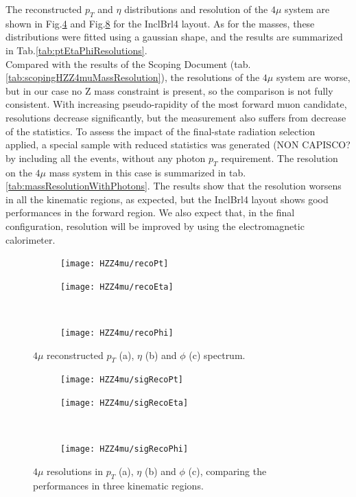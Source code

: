 \documentclass[a4paper,twoside,12pt]{book}
\begin{document}
The reconstructed $p_T$ and $\eta$ distributions and resolution of the $4\mu$ system 
are shown in Fig.\ref{fig:HZZ4mu:recoPtEtaPhi} and Fig.\ref{fig:HZZ4mu:sigRecoPtEtaPhi} for the
InclBrl4 layout. As for the masses, these distributions were fitted using a gaussian shape, 
and the results are summarized in Tab.\ref{tab:ptEtaPhiResolutions}. \\

Compared with the results of the Scoping Document (tab.\ref{tab:scopingHZZ4muMassResolution}), the resolutions
of the $4\mu$ system are worse, but in our case no Z mass constraint is present, so the comparison
is not fully consistent. With increasing pseudo-rapidity of the most forward muon candidate,
resolutions decrease significantly, but the measurement also suffers from 
decrease of the statistics. To assess the impact of the final-state radiation selection applied, a special sample
with reduced statistics was generated (NON CAPISCO? by including all the events, without 
any photon $p_{T}$ requirement. The resolution on the $4\mu$ mass system in this case is summarized
in tab.\ref{tab:massResolutionWithPhotons}. The results show that the resolution worsens in all the kinematic regions, as expected, 
but the InclBrl4
layout shows good performances in the forward region. We also expect that, in the
final configuration, resolution will be improved by using the electromagnetic calorimeter.

\begin{figure}
\begin{subfigure}{.5\linewidth}
\texttt{[image: HZZ4mu/recoPt]}
\caption{}
\label{fig:HZZ4mu:recoPt}
\end{subfigure}
\begin{subfigure}{.5\linewidth}
\centering
\texttt{[image: HZZ4mu/recoEta]}
\caption{}
\label{fig:HZZ4mu:recoEta}
\end{subfigure}\\[1ex]
\begin{subfigure}{\linewidth}
\centering
\texttt{[image: HZZ4mu/recoPhi]}
\caption{}
\label{fig:HZZ4mu:recoPhi}
\end{subfigure}
\caption{$4\mu$ reconstructed $p_{T}$ (a), $\eta$ (b) and $\phi$ (c) spectrum.}
\label{fig:HZZ4mu:recoPtEtaPhi}
\end{figure}

\begin{figure}
\begin{subfigure}{.5\linewidth}
\texttt{[image: HZZ4mu/sigRecoPt]}
\caption{}
\label{fig:HZZ4mu:sigRecoPt}
\end{subfigure}
\begin{subfigure}{.5\linewidth}
\centering
\texttt{[image: HZZ4mu/sigRecoEta]}
\caption{}
\label{fig:HZZ4mu:sigRecoEta}
\end{subfigure}\\[1ex]
\begin{subfigure}{\linewidth}
\centering
\texttt{[image: HZZ4mu/sigRecoPhi]}
\caption{}
\label{fig:HZZ4mu:sigRecoPhi}
\end{subfigure}
\caption{$4\mu$ resolutions in $p_{T}$ (a), $\eta$ (b) and $\phi$ (c), comparing
	the performances in three kinematic regions.}
\label{fig:HZZ4mu:sigRecoPtEtaPhi}
\end{figure}
\end{document}
